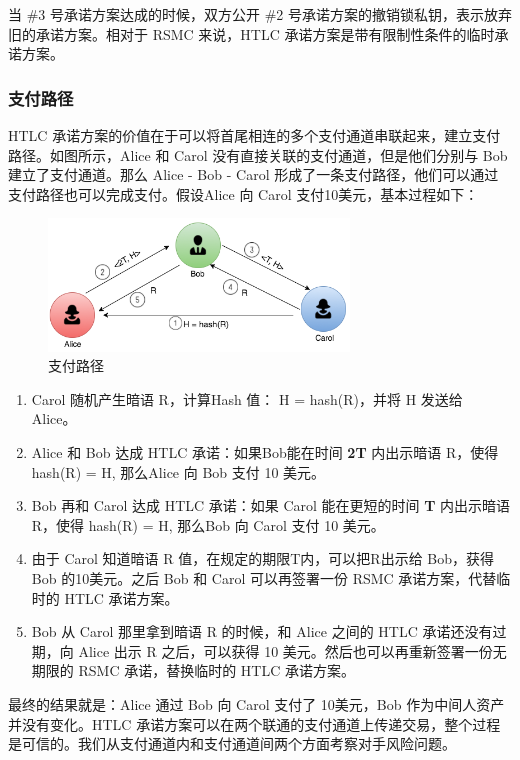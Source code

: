 当 \#3 号承诺方案达成的时候，双方公开 \#2 号承诺方案的撤销锁私钥，表示放弃旧的承诺方案。相对于 RSMC 来说，HTLC 承诺方案是带有限制性条件的临时承诺方案。

\subsubsection{支付路径}
HTLC 承诺方案的价值在于可以将首尾相连的多个支付通道串联起来，建立支付路径。如图所示，Alice 和 Carol 没有直接关联的支付通道，但是他们分别与 Bob 建立了支付通道。那么 Alice - Bob - Carol 形成了一条支付路径，他们可以通过支付路径也可以完成支付。假设Alice 向 Carol 支付10美元，基本过程如下：

\begin{figure}[h!]
    \centering
    \includegraphics[width=8cm, keepaspectratio]{../images/payment_path.png}
    \caption{支付路径}
    \label{fig:htlc_path}
\end{figure}

\begin{enumerate}
    \item Carol 随机产生暗语 R，计算Hash 值： H = hash(R)，并将 H 发送给 Alice。
    \item Alice 和 Bob 达成 HTLC 承诺：如果Bob能在时间 \textbf{2T} 内出示暗语 R，使得 hash(R) = H, 那么Alice 向 Bob 支付 10 美元。
    \item Bob 再和 Carol 达成 HTLC 承诺：如果 Carol 能在更短的时间 \textbf{T} 内出示暗语 R，使得 hash(R) = H, 那么Bob 向 Carol 支付 10 美元。
    \item 由于 Carol 知道暗语 R 值，在规定的期限T内，可以把R出示给 Bob，获得 Bob 的10美元。之后 Bob 和 Carol 可以再签署一份 RSMC 承诺方案，代替临时的 HTLC 承诺方案。
    \item Bob 从 Carol 那里拿到暗语 R 的时候，和 Alice 之间的 HTLC 承诺还没有过期，向 Alice 出示 R 之后，可以获得 10 美元。然后也可以再重新签署一份无期限的 RSMC 承诺，替换临时的 HTLC 承诺方案。
\end{enumerate}

最终的结果就是：Alice 通过 Bob 向 Carol 支付了 10美元，Bob 作为中间人资产并没有变化。HTLC 承诺方案可以在两个联通的支付通道上传递交易，整个过程是可信的。我们从支付通道内和支付通道间两个方面考察对手风险问题。

